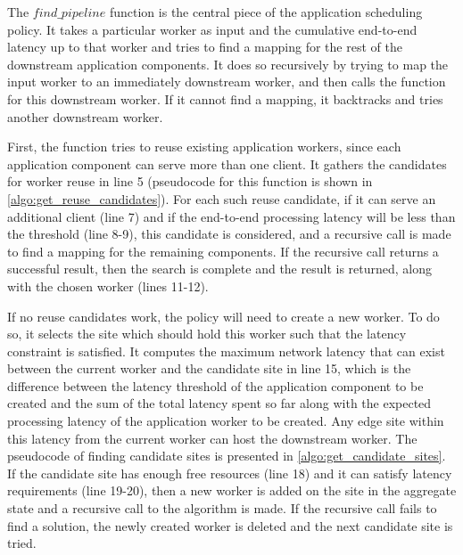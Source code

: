 The $find\_pipeline$ function is the central piece of the application scheduling policy. It takes a particular worker as input and the cumulative end-to-end latency up to that worker and tries to find a mapping for the rest of the downstream application components. It does so recursively by trying to map the input worker to an immediately downstream worker, and then calls the function for this downstream worker. If it cannot find a mapping, it backtracks and tries another downstream worker.
\par First, the function tries to reuse existing application workers, since each application component can serve more than one client. It gathers the candidates for worker reuse in line 5 (pseudocode for this function is shown in \cref{algo:get_reuse_candidates}). For each such reuse candidate, if it can serve an additional client (line 7) and if the end-to-end processing latency will be less than the threshold (line 8-9), this candidate is considered, and a recursive call is made to find a mapping for the remaining components. If the recursive call returns a successful result, then the search is complete and the result is returned, along with the chosen worker (lines 11-12).
\par If no reuse candidates work, the policy will need to create a new worker. To do so, it selects the site which should hold this worker such that the latency constraint is satisfied. It computes the maximum network latency that can exist between the current worker and the candidate site in line 15, which is the difference between the latency threshold of the application component to be created and the sum of the total latency spent so far along with the expected processing latency of the application worker to be created. Any edge site within this latency from the current worker can host the downstream worker. The pseudocode of finding candidate sites is presented in \cref{algo:get_candidate_sites}. If the candidate site has enough free resources (line 18) and it can satisfy latency requirements (line 19-20), then a new worker is added on the site in  the aggregate state and a recursive call to the algorithm is made. If the recursive call fails to find a solution, the newly created worker is deleted and the next candidate site is tried.

